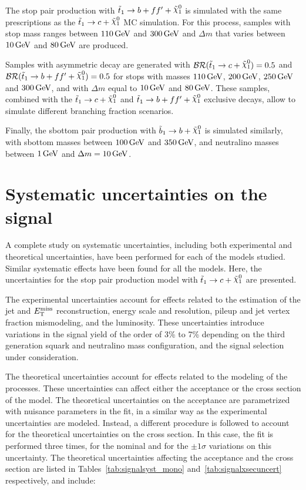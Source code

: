The stop pair production with $\stopfourbody$ is simulated with the same prescriptions as the $\stoptocharm$ MC simulation.
For this process, samples with stop mass ranges between $\unit[110]{GeV}$ and $\unit[300]{GeV}$ and $\Delta m$ that varies between $\unit[10]{GeV}$ and $\unit[80]{GeV}$ are produced.

Samples with asymmetric decay are generated with $\BR{\stoptocharm}=0.5$ and $\BR{\stopfourbody}=0.5$ for stops with masses $\unit[110]{GeV}$, $\unit[200]{GeV}$, $\unit[250]{GeV}$ and $\unit[300]{GeV}$, and with $\Delta m$ equal to $\unit[10]{GeV}$ and $\unit[80]{GeV}$.
These samples, combined with the $\stoptocharm$ and $\stopfourbody$ exclusive decays, allow to simulate different branching fraction scenarios.

Finally, the sbottom pair production with $\sbottomtob$ is simulated similarly, with sbottom masses between $\unit[100]{GeV}$ and $\unit[350]{GeV}$, and neutralino masses between $\unit[1]{GeV}$ and $\Delta m = \unit[10]{GeV}$.


\section{Systematic uncertainties on the signal}
    \label{sec:SysUncertaintiesSignal}

A complete study on systematic uncertainties, including both experimental and theoretical uncertainties, have been performed for each of the models studied.
Similar systematic effects have been found for all the models.
Here, the uncertainties for the stop pair production model with $\stoptocharm$ are presented.

The experimental uncertainties account for effects related to the estimation of the jet and $E_{\mathrm{T}}^{\mathrm{miss}}$ reconstruction, energy scale and resolution, pileup and jet vertex fraction mismodeling, and the luminosity.
These uncertainties introduce variations in the signal yield of the order of 3\% to 7\% depending on the third generation squark and neutralino mass configuration, and the signal selection under consideration.

The theoretical uncertainties account for effects related to the modeling of the processes.
These uncertainties can affect either the acceptance or the cross section of the model.
The theoretical uncertainties on the acceptance are parametrized with nuisance parameters in the fit, in a similar way as the experimental uncertainties are modeled.
Instead, a different procedure is followed to account for the theoretical uncertainties on the cross section.
In this case, the fit is performed three times, for the nominal and for the $\pm 1 \sigma$ variations on this uncertainty.
The theoretical uncertainties affecting the acceptance and the cross section are listed in Tables~\ref{tab:signalsyst_mono} and~\ref{tab:signalxsecuncert} respectively, and include:

